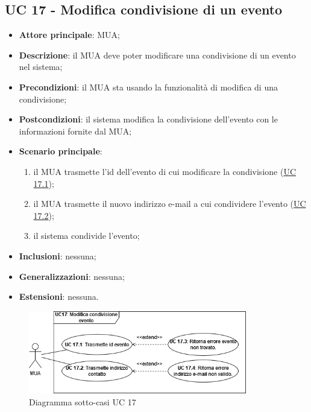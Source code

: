 \subsection{UC 17 - Modifica condivisione di un evento} \label{sec:UC17}

    \begin{itemize}
        \item \textbf{Attore principale}: MUA;
        \item \textbf{Descrizione}: il MUA deve poter modificare una condivisione di un evento nel sistema;
        \item \textbf{Precondizioni}: il MUA sta usando la funzionalità di modifica di una condivisione;
        \item \textbf{Postcondizioni}: il sistema modifica la condivisione dell'evento con le informazioni fornite dal MUA;
        \item \textbf{Scenario principale}:
            \begin{enumerate}
                \item il MUA trasmette l'id dell'evento di cui modificare la condivisione (\hyperref[sec:UC17.1]{UC 17.1});
                \item il MUA trasmette il nuovo indirizzo e-mail a cui condividere l'evento (\hyperref[sec:UC17.2]{UC 17.2});
                \item il sistema condivide l'evento;
            \end{enumerate}
        \item \textbf{Inclusioni}: nessuna;
        \item \textbf{Generalizzazioni}: nessuna;
        \item \textbf{Estensioni}: nessuna.
    \end{itemize}

    \begin{figure}[H]
        \includegraphics[width=0.85\textwidth]{sections/uc_imgs/UC17.png}
        \centering
        \caption{Diagramma sotto-casi UC 17}
    \end{figure}



